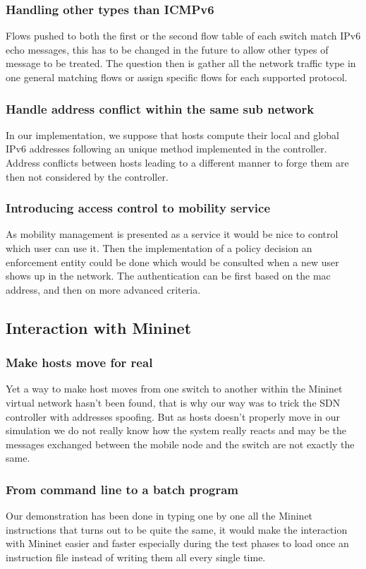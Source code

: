\documentclass{article}
\begin{document}
\subsubsection{Handling other types than ICMPv6}
Flows pushed to both the first or the second flow table of each switch
match IPv6 echo messages, this has to be changed in the future
to allow other types of message to be treated. The question then is
gather all the network traffic type in one general matching flows or
assign specific flows for each supported protocol.


\subsubsection{Handle address conflict within the same sub network}
In our implementation, we suppose that hosts compute their local and
global IPv6 addresses following an unique method implemented in the
controller. Address conflicts between hosts leading to a different
manner to forge them are then not considered by the controller.

\subsubsection{Introducing access control to mobility service}
As mobility management is presented as a service it would be nice to
control which user can use it. Then the implementation of a policy
decision an enforcement entity could be done which would be consulted
when a new user shows up in the network. The authentication can be
first based on the mac address, and then on more advanced criteria. 

\subsection{Interaction with Mininet}

\subsubsection{Make hosts move for real}
Yet a way to make host moves from one switch to another within the
Mininet virtual network hasn't been found, that is why our way was to
trick the SDN controller with addresses spoofing. But as hosts doesn't
properly move in our simulation we do not really know how the system
really reacts and may be the messages exchanged between the mobile
node and the switch are not exactly the same.

\subsubsection{From command line to a batch program}
Our demonstration has been done in typing one by one all the Mininet
instructions that turns out to be quite the same, it would make the
interaction with Mininet easier and faster especially during the test
phases to load once an instruction file instead of writing them all
every single time. 
 
\end{document}
